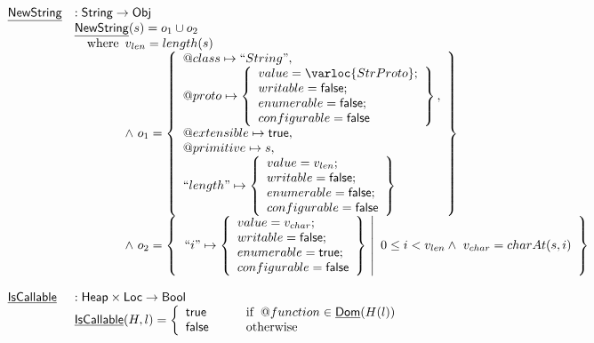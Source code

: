 \[\begin{array}{ll}
\chf{NewString} & : \SF{String} \rightarrow \SF{Obj} \\
& \chf{NewString}(s) = o_1 \cup o_2 \\
& \quad\wherec{
  v_{len} = length(s)\\
  \land\ o_1 = \set{
    \varprop{class}\mapsto ``String",\\
    \varprop{proto}\mapsto 
    \set{
      value=\varloc{StrProto};\\writable=\vfalse;\\
      enumerable=\vfalse;\\configurable=\vfalse
    },\\
    \varprop{extensible}\mapsto \vtrue, \\
    \varprop{primitive}\mapsto s, \\
    ``length"\mapsto \set{
      value=v_{len};\\writable=\vfalse;\\
      enumerable=\vfalse;\\configurable=\vfalse
    }
  }\\
  \land\ o_2 = \set{\left.``i"\mapsto \set{
      value = v_{char};\\writable=\vfalse;\\
      enumerable=\vtrue;\\configurable=\vfalse
    } ~\right|~ 0 \leq i < v_{len}\land\ v_{char}=charAt(s,i)}
}\\\\

\chf{IsCallable} & : \SF{Heap} \times \SF{Loc} \rightarrow \SF{Bool} \\
& \chf{IsCallable}(H,l)
  = \left\{
    \begin{array}{l@{\quad\quad\quad}l}
      \vtrue &\ifc{\varprop{function}\in\chf{Dom}(H(l))}\\
      \vfalse &\owc
    \end{array}
    \right.\\\\
\end{array}
\]
